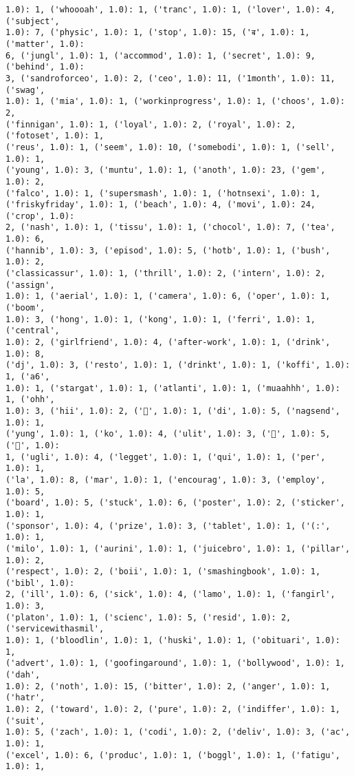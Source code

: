 \documentclass[11pt]{article}
\begin{document}
\begin{Verbatim}[commandchars=\\\{\}]
1.0): 1, ('whoooah', 1.0): 1, ('tranc', 1.0): 1, ('lover', 1.0): 4, ('subject',
1.0): 7, ('physic', 1.0): 1, ('stop', 1.0): 15, ('ब', 1.0): 1, ('matter', 1.0):
6, ('jungl', 1.0): 1, ('accommod', 1.0): 1, ('secret', 1.0): 9, ('behind', 1.0):
3, ('sandroforceo', 1.0): 2, ('ceo', 1.0): 11, ('1month', 1.0): 11, ('swag',
1.0): 1, ('mia', 1.0): 1, ('workinprogress', 1.0): 1, ('choos', 1.0): 2,
('finnigan', 1.0): 1, ('loyal', 1.0): 2, ('royal', 1.0): 2, ('fotoset', 1.0): 1,
('reus', 1.0): 1, ('seem', 1.0): 10, ('somebodi', 1.0): 1, ('sell', 1.0): 1,
('young', 1.0): 3, ('muntu', 1.0): 1, ('anoth', 1.0): 23, ('gem', 1.0): 2,
('falco', 1.0): 1, ('supersmash', 1.0): 1, ('hotnsexi', 1.0): 1,
('friskyfriday', 1.0): 1, ('beach', 1.0): 4, ('movi', 1.0): 24, ('crop', 1.0):
2, ('nash', 1.0): 1, ('tissu', 1.0): 1, ('chocol', 1.0): 7, ('tea', 1.0): 6,
('hannib', 1.0): 3, ('episod', 1.0): 5, ('hotb', 1.0): 1, ('bush', 1.0): 2,
('classicassur', 1.0): 1, ('thrill', 1.0): 2, ('intern', 1.0): 2, ('assign',
1.0): 1, ('aerial', 1.0): 1, ('camera', 1.0): 6, ('oper', 1.0): 1, ('boom',
1.0): 3, ('hong', 1.0): 1, ('kong', 1.0): 1, ('ferri', 1.0): 1, ('central',
1.0): 2, ('girlfriend', 1.0): 4, ('after-work', 1.0): 1, ('drink', 1.0): 8,
('dj', 1.0): 3, ('resto', 1.0): 1, ('drinkt', 1.0): 1, ('koffi', 1.0): 1, ('a6',
1.0): 1, ('stargat', 1.0): 1, ('atlanti', 1.0): 1, ('muaahhh', 1.0): 1, ('ohh',
1.0): 3, ('hii', 1.0): 2, ('🙈', 1.0): 1, ('di', 1.0): 5, ('nagsend', 1.0): 1,
('yung', 1.0): 1, ('ko', 1.0): 4, ('ulit', 1.0): 3, ('🎉', 1.0): 5, ('🎈', 1.0):
1, ('ugli', 1.0): 4, ('legget', 1.0): 1, ('qui', 1.0): 1, ('per', 1.0): 1,
('la', 1.0): 8, ('mar', 1.0): 1, ('encourag', 1.0): 3, ('employ', 1.0): 5,
('board', 1.0): 5, ('stuck', 1.0): 6, ('poster', 1.0): 2, ('sticker', 1.0): 1,
('sponsor', 1.0): 4, ('prize', 1.0): 3, ('tablet', 1.0): 1, ('(:', 1.0): 1,
('milo', 1.0): 1, ('aurini', 1.0): 1, ('juicebro', 1.0): 1, ('pillar', 1.0): 2,
('respect', 1.0): 2, ('boii', 1.0): 1, ('smashingbook', 1.0): 1, ('bibl', 1.0):
2, ('ill', 1.0): 6, ('sick', 1.0): 4, ('lamo', 1.0): 1, ('fangirl', 1.0): 3,
('platon', 1.0): 1, ('scienc', 1.0): 5, ('resid', 1.0): 2, ('servicewithasmil',
1.0): 1, ('bloodlin', 1.0): 1, ('huski', 1.0): 1, ('obituari', 1.0): 1,
('advert', 1.0): 1, ('goofingaround', 1.0): 1, ('bollywood', 1.0): 1, ('dah',
1.0): 2, ('noth', 1.0): 15, ('bitter', 1.0): 2, ('anger', 1.0): 1, ('hatr',
1.0): 2, ('toward', 1.0): 2, ('pure', 1.0): 2, ('indiffer', 1.0): 1, ('suit',
1.0): 5, ('zach', 1.0): 1, ('codi', 1.0): 2, ('deliv', 1.0): 3, ('ac', 1.0): 1,
('excel', 1.0): 6, ('produc', 1.0): 1, ('boggl', 1.0): 1, ('fatigu', 1.0): 1,

\end{Verbatim}
\end{document}
